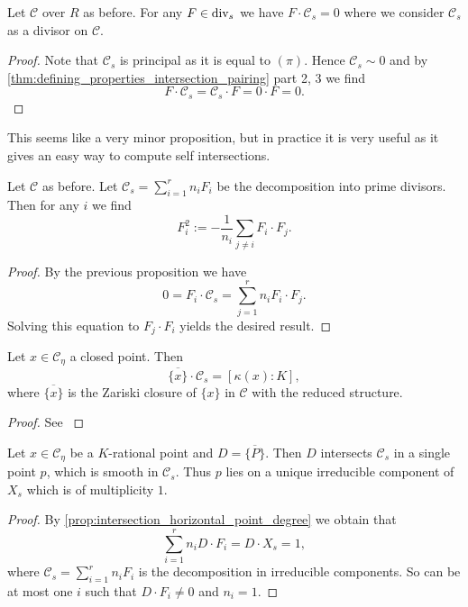 \begin{proposition}
	Let $\mathscr C$ over $R$ as before. 
	For any $F \in \operatorname{div}_s$ we have $F\cdot \mathscr C_s = 0$ where we consider $\mathscr C_s$ as a divisor on $\mathscr C$. 
\end{proposition}
\begin{proof}
	Note that $\mathscr C_s$ is principal as it is equal to $(\pi)$. 
	Hence $\mathscr C_s \sim 0$ and by \cref{thm:defining_properties_intersection_pairing} part 2, 3 we find \[
	F\cdot \mathscr C_s = \mathscr C_s \cdot F = 0 \cdot F = 0
	.\] 
\end{proof}
This seems like a very minor proposition, but in practice it is very useful as it gives an easy way to compute self intersections. 
\begin{corollary}\label{cor:compute_self_intersection}
	Let $\mathscr C$ as before. 
	Let $\mathscr C_s = \sum_{i =1}^{r} n_i F_i$ be the decomposition into prime divisors. 
	Then for any $i$ we find \[
		F^2_i := -\frac{1}{n_i} \sum_{j \ne i} F_i \cdot F_j
	.\] 
\end{corollary}
\begin{proof}
	By the previous proposition we have \[
	 0 = F_i \cdot \mathscr C_s = \sum_{j = 1}^{r} n_i F_i \cdot F_j
	.\] 
	Solving this equation to $F_j \cdot F_i$ yields the desired result. 
\end{proof}

\begin{proposition}\label{prop:intersection_horizontal_point_degree}
	Let $x \in \mathscr C_\eta$ a closed point. 
	Then \[
		\overline{\{x\} }\cdot \mathscr C_s = [\kappa(x): K]
	,\] 
	where $\overline{\{x\} }$ is the Zariski closure of $\{x\} $ in $\mathscr C$ with the reduced structure. 
\end{proposition}
\begin{proof}
	See \cite[prop.\ 9.1.30]{liuAlgebraicGeometryArithmetic2002}
\end{proof}


\begin{corollary}\label{cor:closure_K_rational_point}
	Let $x \in \mathscr C_\eta$ be a $K$-rational point and $D = \overline{\{P\} } $. 
	Then $D$ intersects $\mathscr C_s$ in a single point $p$, which is smooth in $\mathscr C_s$. 
	Thus $p$ lies on a unique irreducible component of $X_s$ which is of multiplicity $1$. 
\end{corollary}
\begin{proof}
	By \cref{prop:intersection_horizontal_point_degree} we obtain that \[
	\sum_{i = 1}^{r}  n_i D\cdot F_i = D \cdot X_s = 1
	,\] 
	where $\mathscr C_s = \sum_{i =1}^{r} n_i F_i$ is the decomposition in irreducible components. 
	So can be at most one $i$ such that $D\cdot F_i \ne  0$ and $n_i = 1$. 
\end{proof}

